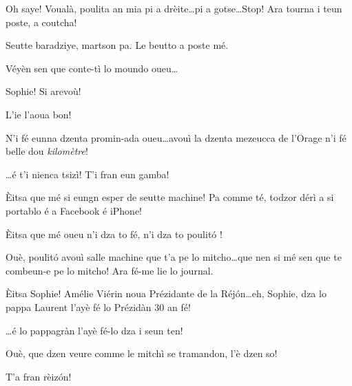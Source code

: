 \begin{drama}

\Maganspeaks Oh saye! Voualà, poulita an mia pi a drèite\ldots pi a gotse\ldots Stop! Ara tourna i teun poste, a coutcha!


\Maganspeaks Seutte baradziye, martson pa. Le beutto a poste mé.


\Maganspeaks{} Véyèn sen que conte-tì lo moundo oueu\ldots


\Paganspeaks Sophie! Si arevoù!

\Maganspeaks L'ie l’aoua bon!

\Paganspeaks {} N'i fé eunna dzenta promin-ada oueu\ldots avouì la dzenta mezeucca de l’Orage n'i fé belle dou \textit{kilomètre}!

\Maganspeaks \ldots é t'i nienca tsizì! T'i fran eun gamba!


\Paganspeaks \`Eitsa que mé si eungn esper de seutte machine! Pa comme té, todzor dérì a si portablo é a Facebook é iPhone!

\Maganspeaks \`Eitsa que mé oueu n'i dza to fé, n'i dza to poulit\'o !


\Paganspeaks Ouè, poulit\'o avouì salle machine que t'a pe lo mitcho\ldots que nen si mé sen que te combeun-e pe lo mitcho!  Ara fé-me lie lo journal.

\Paganspeaks \`Eitsa Sophie! Amélie Viérin noua Prézidante de la Réj\'on\ldots eh, Sophie, dza lo pappa Laurent l'ayè fé lo Prézidàn 30 an fé!

\Maganspeaks \ldots é lo pappagràn l'ayè fé-lo dza i seun ten!

\Paganspeaks Ouè, que dzen veure comme le mitchì se tramandon, l'è dzen so!

\Maganspeaks T'a fran rèiz\'on!



\end{drama}
